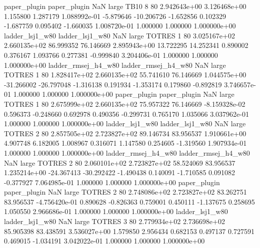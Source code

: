        paper_plugin        paper_plugin                   NaN      large     TB10                 8 80 2.942643e+00   3.126468e+00      1.155800       1.287179  1.088992e-01     -5.879646    -10.206726    -1.652856       0.102329 -1.687759   0.095402    -1.660035   1.008720e-01            1.000000        1.000000        1.000000e+00
    ladder_lsj1_w80     ladder_lsj1_w80                   NaN      large   TOTRES                 1 80 3.025167e+02   2.660135e+02     86.999352      76.146669  2.895943e+00     13.722295     14.252341     0.890002       0.376167  1.093766   0.277381    -0.999840   3.204406e-01            1.000000        1.000000        1.000000e+00
ladder_rmsej_h4_w80 ladder_rmsej_h4_w80                   NaN      large   TOTRES                 1 80 1.828417e+02   2.660135e+02     55.741610      76.146669  1.044575e+00    -31.266002    -26.797048    -1.316138       0.191934 -1.353174   0.179860    -0.892819   3.746657e-01            1.000000        1.000000        1.000000e+00
       paper_plugin        paper_plugin                   NaN      large   TOTRES                 1 80 2.675999e+02   2.660135e+02     75.957322      76.146669 -8.159328e-02      0.596373     -0.248660     0.692978       0.490356 -0.299731   0.765170     1.035066   3.037962e-01            1.000000        1.000000        1.000000e+00
    ladder_lsj1_w80     ladder_lsj1_w80                   NaN      large   TOTRES                 2 80 2.857505e+02   2.723827e+02     89.146734      83.956537  1.910661e+00      4.907748      6.182005     1.008967       0.316071  1.147580   0.254605    -1.319560   1.907934e-01            1.000000        1.000000        1.000000e+00
ladder_rmsej_h4_w80 ladder_rmsej_h4_w80                   NaN      large   TOTRES                 2 80 2.060101e+02   2.723827e+02     58.524069      83.956537  1.235214e+00    -24.367413    -30.292422    -1.490438       0.140091 -1.710585   0.091082    -0.377927   7.064985e-01            1.000000        1.000000        1.000000e+00
       paper_plugin        paper_plugin                   NaN      large   TOTRES                 2 80 2.748086e+02   2.723827e+02     83.262751      83.956537 -4.756420e-01      0.890628     -0.826363     0.759001       0.450111 -1.137675   0.258695     1.050550   2.966686e-01            1.000000        1.000000        1.000000e+00
    ladder_lsj1_w80     ladder_lsj1_w80                   NaN      large   TOTRES                 3 80 2.779934e+02   2.736698e+02     85.905398      83.438591  3.536027e+00      1.579850      2.956434     0.682153       0.497137  0.727591   0.469015    -1.034191   3.042022e-01            1.000000        1.000000        1.000000e+00
